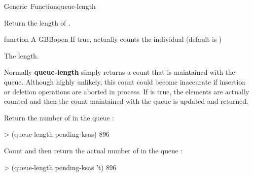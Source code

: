 \documentclass[10pt,twoside,english,pdftex]{article}
\begin{document}
\begin{functiondoc}{Generic~Function}{queue-length}{
      \returns{} }
%
%

\fnsyntax

\fnpurpose Return the length of .

\fnmethods
{} 

\fnpackage {}

\fnmodule {}

\fnargs
\begin{args}{function}
\arg[queue] A GBBopen 
\arg[recount-p] If true, actually counts the individual
 (default is \nil) 
\end{args}

\fnreturns The  length.

\fndescription Normally \textbf{queue-length} simply returns a count
that is maintained with the queue.  Although highly unlikely, this
count could become inaccurate if  insertion or
deletion operations are aborted in process. If  is
true, the elements are actually counted and then the count maintained
with the queue is updated and returned.

\fnexamples
Return the number of  in the queue :
\begin{example}
> (queue-length pending-ksas)
896
\end{example}
Count and then return the actual number of  in the
queue :
\begin{example}
> (queue-length pending-ksas 't)
896
\end{example}

\end{functiondoc}

\end{document}
